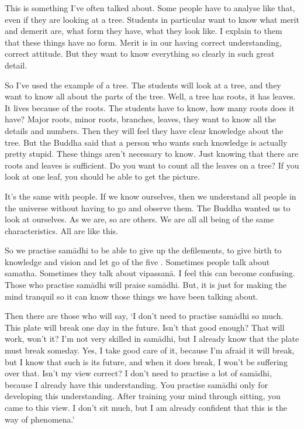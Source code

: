 This is something I've often talked about. Some people have to analyse like that, even if they are looking at a tree. Students in particular want to know what merit and demerit are, what form they have, what they look like. I explain to them that these things have no form. Merit is in our having correct understanding, correct attitude. But they want to know everything so clearly in such great detail.

So I've used the example of a tree. The students will look at a tree, and they want to know all about the parts of the tree. Well, a tree has roots, it has leaves. It lives because of the roots. The students have to know, how many roots does it have? Major roots, minor roots, branches, leaves, they want to know all the details and numbers. Then they will feel they have clear knowledge about the tree. But the Buddha said that a person who wants such knowledge is actually pretty stupid. These things aren't necessary to know. Just knowing that there are roots and leaves is sufficient. Do you want to count all the leaves on a tree? If you look at one leaf, you should be able to get the picture.

It's the same with people. If we know ourselves, then we understand all people in the universe without having to go and observe them. The Buddha wanted us to look at ourselves. As we are, so are others. We are all  all being of the same characteristics. All  are like this.

So we practise sam\=adhi to be able to give up the defilements, to give birth to knowledge and vision and let go of the five . Sometimes people talk about samatha. Sometimes they talk about vipassan\=a. I feel this can become confusing. Those who practise sam\=adhi will praise sam\=adhi. But, it is just for making the mind tranquil so it can know those things we have been talking about.

Then there are those who will say, `I don't need to practise sam\=adhi so much. This plate will break one day in the future. Isn't that good enough? That will work, won't it? I'm not very skilled in sam\=adhi, but I already know that the plate must break someday. Yes, I take good care of it, because I'm afraid it will break, but I know that such is its future, and when it does break, I won't be suffering over that. Isn't my view correct? I don't need to practise a lot of sam\=adhi, because I already have this understanding. You practise sam\=adhi only for developing this understanding. After training your mind through sitting, you came to this view. I don't sit much, but I am already confident that this is the way of phenomena.'

